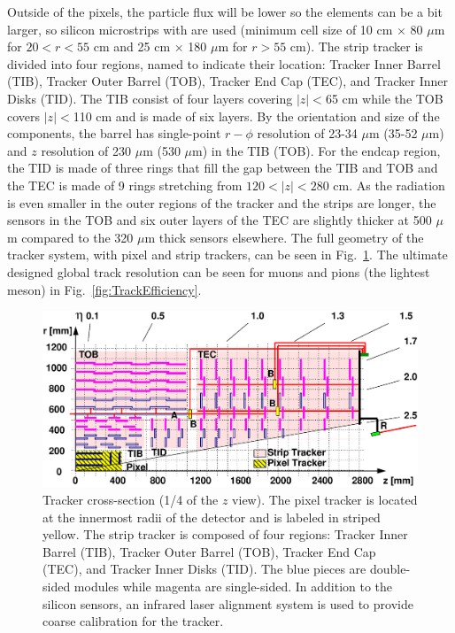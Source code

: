 Outside of the pixels, the particle flux will be lower so the elements can be a bit larger, so silicon microstrips with are used (minimum cell size of 10 cm $\times$ 80 $\mu$m for $20 < r < 55$ cm and 25 cm $\times$ 180 $\mu$m for $r>55$ cm). The strip tracker is divided into four regions, named to indicate their location: Tracker Inner Barrel (TIB), Tracker Outer Barrel (TOB), Tracker End Cap (TEC), and Tracker Inner Disks (TID). The TIB consist of four layers covering $|z|<$65 cm while the TOB covers $|z|<$110 cm and is made of six layers. By the orientation and size of the components, the barrel has single-point $r-\phi$ resolution of 23-34 $\mu$m (35-52 $\mu$m) and $z$ resolution of 230 $\mu$m (530 $\mu$m) in the TIB (TOB). For the endcap region, the TID is made of three rings that fill the gap between the TIB and TOB and the TEC is made of 9 rings stretching from $120 < |z| < 280$ cm. As the radiation is even smaller in the outer regions of the tracker and the strips are longer, the sensors in the TOB and six outer layers of the TEC are slightly thicker at 500 $\mu$m compared to the 320 $\mu$m thick sensors elsewhere. The full geometry of the tracker system, with pixel and strip trackers, can be seen in Fig.~\ref{fig:TrackerSystem}. The ultimate designed global track resolution can be seen for muons and pions (the lightest meson) in Fig.~\ref{fig:TrackEfficiency}.

\begin{figure}[htbp]
\begin{center}
\includegraphics[width=.8\linewidth]{Experiment/figures/TrackerSystemLAS.eps}
\caption[Geometry of the Tracker System]{Tracker cross-section (1/4 of the $z$ view). The pixel tracker is located at the innermost radii of the detector and is labeled in striped yellow. The strip tracker is composed of four regions: Tracker Inner Barrel (TIB), Tracker Outer Barrel (TOB), Tracker End Cap (TEC), and Tracker Inner Disks (TID). The blue pieces are double-sided modules while magenta are single-sided. In addition to the silicon sensors, an infrared laser alignment system is used to provide coarse calibration for the tracker.}
\label{fig:TrackerSystem}
\end{center}
\end{figure}


